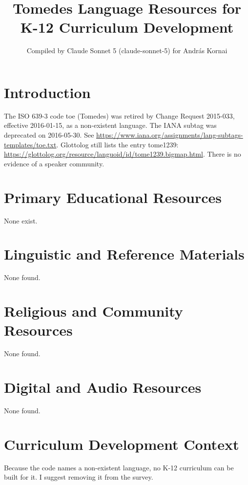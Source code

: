 \documentclass[12pt]{article}
\title{Tomedes Language Resources for K-12 Curriculum Development}
\author{Compiled by Claude Sonnet 5 (claude-sonnet-5) for Andr\'as Kornai}
\date{}
\begin{document}
\maketitle

\section{Introduction}
The ISO 639-3 code toe (Tomedes) was retired by Change Request 2015-033, effective 2016-01-15, as a non-existent language. The IANA subtag was deprecated on 2016-05-30. See \url{https://www.iana.org/assignments/lang-subtags-templates/toe.txt}. Glottolog still lists the entry tome1239: \url{https://glottolog.org/resource/languoid/id/tome1239.bigmap.html}. There is no evidence of a speaker community.

\section{Primary Educational Resources}
None exist.

\section{Linguistic and Reference Materials}
None found.

\section{Religious and Community Resources}
None found.

\section{Digital and Audio Resources}
None found.

\section{Curriculum Development Context}
Because the code names a non-existent language, no K-12 curriculum can be built for it. I suggest removing it from the survey.
\end{document}
